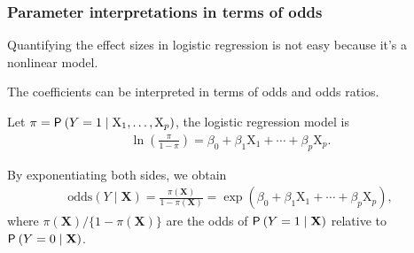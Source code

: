 \documentclass{beamer}
\begin{document}
\begin{frame}[fragile]
\frametitle{Parameter interpretations in terms of odds}
\bi
\item Quantifying the effect sizes in logistic regression is not easy because it's a nonlinear model.
\item The coefficients can be interpreted in terms of \alert{odds} and \alert{odds ratios}.
\item Let $\pi=\P{Y=1\mid \mathrm{X}_1, \ldots, \mathrm{X}_p}$, the logistic regression model is 
\begin{align*}
\ln\left(\frac{\pi}{1-\pi}\right)=\beta_0+ \beta_1 \mathrm{X}_1 + \cdots + \beta_p\mathrm{X}_p.
\end{align*}
\item By exponentiating both sides, we obtain 
\begin{align*}
\mathrm{odds}(Y\mid \mathbf{X}) = \frac{\pi(\mathbf{X})}{1-\pi(\mathbf{X})}=\exp(\beta_0+ \beta_1 \mathrm{X}_1 + \cdots + \beta_p\mathrm{X}_p),
\end{align*}
where $\pi(\mathbf{X})/\{1-\pi(\mathbf{X})\}$ are the odds of $\P{Y=1 \mid \mathbf{X}}$ relative to $\P{Y=0 \mid\mathbf{X}}$.
\ei
\end{frame}
\end{document}
